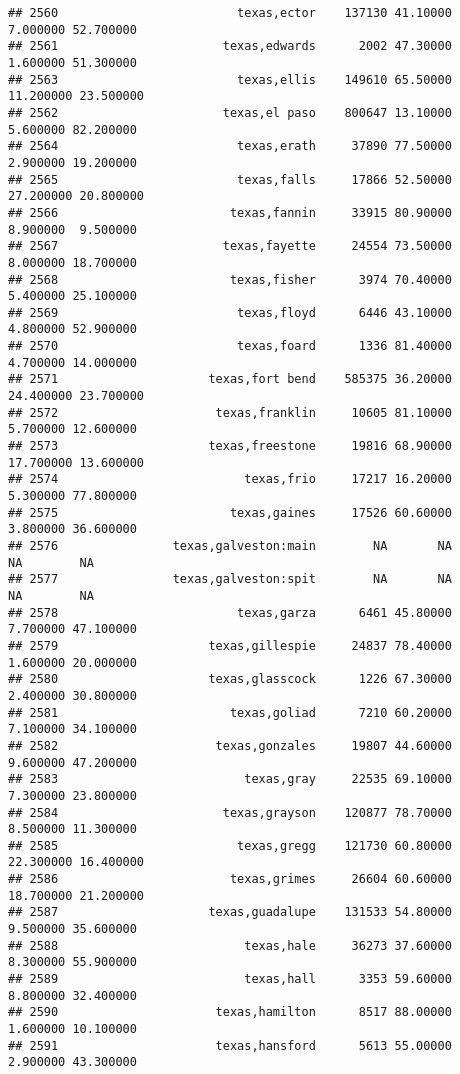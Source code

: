 \documentclass[
]{article}
\begin{document}
\begin{verbatim}
## 2560                         texas,ector    137130 41.10000  7.000000 52.700000
## 2561                       texas,edwards      2002 47.30000  1.600000 51.300000
## 2563                         texas,ellis    149610 65.50000 11.200000 23.500000
## 2562                       texas,el paso    800647 13.10000  5.600000 82.200000
## 2564                         texas,erath     37890 77.50000  2.900000 19.200000
## 2565                         texas,falls     17866 52.50000 27.200000 20.800000
## 2566                        texas,fannin     33915 80.90000  8.900000  9.500000
## 2567                       texas,fayette     24554 73.50000  8.000000 18.700000
## 2568                        texas,fisher      3974 70.40000  5.400000 25.100000
## 2569                         texas,floyd      6446 43.10000  4.800000 52.900000
## 2570                         texas,foard      1336 81.40000  4.700000 14.000000
## 2571                     texas,fort bend    585375 36.20000 24.400000 23.700000
## 2572                      texas,franklin     10605 81.10000  5.700000 12.600000
## 2573                     texas,freestone     19816 68.90000 17.700000 13.600000
## 2574                          texas,frio     17217 16.20000  5.300000 77.800000
## 2575                        texas,gaines     17526 60.60000  3.800000 36.600000
## 2576                texas,galveston:main        NA       NA        NA        NA
## 2577                texas,galveston:spit        NA       NA        NA        NA
## 2578                         texas,garza      6461 45.80000  7.700000 47.100000
## 2579                     texas,gillespie     24837 78.40000  1.600000 20.000000
## 2580                     texas,glasscock      1226 67.30000  2.400000 30.800000
## 2581                        texas,goliad      7210 60.20000  7.100000 34.100000
## 2582                      texas,gonzales     19807 44.60000  9.600000 47.200000
## 2583                          texas,gray     22535 69.10000  7.300000 23.800000
## 2584                       texas,grayson    120877 78.70000  8.500000 11.300000
## 2585                         texas,gregg    121730 60.80000 22.300000 16.400000
## 2586                        texas,grimes     26604 60.60000 18.700000 21.200000
## 2587                     texas,guadalupe    131533 54.80000  9.500000 35.600000
## 2588                          texas,hale     36273 37.60000  8.300000 55.900000
## 2589                          texas,hall      3353 59.60000  8.800000 32.400000
## 2590                      texas,hamilton      8517 88.00000  1.600000 10.100000
## 2591                      texas,hansford      5613 55.00000  2.900000 43.300000

\end{verbatim}
\end{document}
